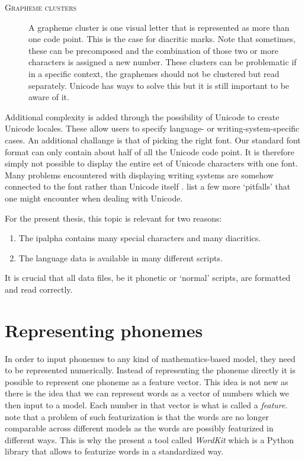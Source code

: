 \begin{description}
\item[\textsc{Grapheme clusters}] A grapheme cluster is one visual letter that is represented as more than one code point. This is the case for diacritic marks. Note that sometimes, these can be precomposed and the combination of those two or more characters is assigned a new number. These clusters can be problematic if in a specific context, the graphemes should not be clustered but read separately. Unicode has ways to solve this but it is still important to be aware of it.
\end{description} 

Additional complexity is added through the possibility of Unicode to create Unicode locales. These allow users to specify language- or writing-system-specific cases. An additional challange is that of picking the right font. Our standard font format can only contain about half of all the Unicode code point. It is therefore simply not possible to display the entire set of Unicode characters with one font. Many problems encountered with displaying writing systems are somehow connected to the font rather than Unicode itself \citep{unicode-lingu}. \citet{unicode-lingu} list a few more `pitfalls' that one might encounter when dealing with Unicode.

For the present thesis, this topic is relevant for two reasons: 
\begin{enumerate}
\item The \ac{ipalpha} contains many special characters and many diacritics.
\item The language data is available in many different scripts.
\end{enumerate} 

It is crucial that all data files, be it phonetic or `normal' scripts, are formatted and read correctly.

\section{Representing phonemes}
\label{phon-features}
In order to input phonemes to any kind of mathematics-based model, they need to be represented numerically. Instead of representing the phoneme directly it is possible to represent one phoneme as a feature vector. This idea is not new as there is the idea that we can represent words as a vector of numbers which we then input to a model. Each number in that vector is what is called a \textit{feature}. \citet{tulkens-etal-2018-wordkit} note that a problem of such featurization is that the words are no longer comparable across different models as the words are possibly featurized in different ways. This is why the present a tool called \textit{WordKit} which is a Python library that allows to featurize words in a standardized way.




